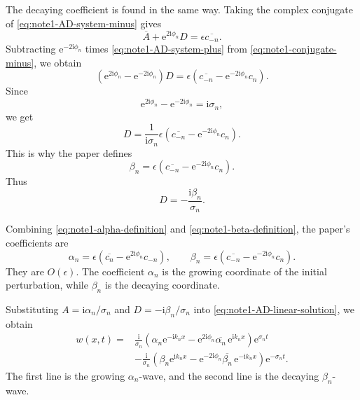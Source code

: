 \documentclass{amsart}
\newcounter{note}
\numberwithin{equation}{hw}
\begin{document}
The decaying coefficient is found in the same way.  Taking the complex
conjugate of \eqref{eq:note1-AD-system-minus} gives
\begin{equation}
\overline{A}+\mathrm{e}^{2\mathrm{i}\phi_n}D
=
\epsilon\overline{c_{-n}}.
\label{eq:note1-conjugate-minus}
\end{equation}
Subtracting \(\mathrm{e}^{-2\mathrm{i}\phi_n}\) times
\eqref{eq:note1-AD-system-plus} from \eqref{eq:note1-conjugate-minus}, we
obtain
\begin{equation}
\left(
\mathrm{e}^{2\mathrm{i}\phi_n}
-
\mathrm{e}^{-2\mathrm{i}\phi_n}
\right)D
=
\epsilon
\left(
\overline{c_{-n}}
-
\mathrm{e}^{-2\mathrm{i}\phi_n}c_n
\right).
\label{eq:note1-solve-D-pre}
\end{equation}
Since
\[
\mathrm{e}^{2\mathrm{i}\phi_n}
-
\mathrm{e}^{-2\mathrm{i}\phi_n}
=
\mathrm{i}\sigma_n,
\]
we get
\begin{equation}
D
=
\frac{1}{\mathrm{i}\sigma_n}
\epsilon
\left(
\overline{c_{-n}}
-
\mathrm{e}^{-2\mathrm{i}\phi_n}c_n
\right).
\label{eq:note1-D-beta-pre}
\end{equation}
This is why the paper defines
\begin{equation}
\beta_n
=
\epsilon
\left(
\overline{c_{-n}}
-
\mathrm{e}^{-2\mathrm{i}\phi_n}c_n
\right).
\label{eq:note1-beta-definition}
\end{equation}
Thus
\begin{equation}
D=-\frac{\mathrm{i}\beta_n}{\sigma_n}.
\label{eq:note1-D-beta}
\end{equation}

Combining \eqref{eq:note1-alpha-definition} and
\eqref{eq:note1-beta-definition}, the paper's coefficients are
\begin{equation}
\alpha_n
=
\epsilon
\left(
\overline{c_n}
-
\mathrm{e}^{2\mathrm{i}\phi_n}c_{-n}
\right),
\qquad
\beta_n
=
\epsilon
\left(
\overline{c_{-n}}
-
\mathrm{e}^{-2\mathrm{i}\phi_n}c_n
\right).
\label{eq:note1-alpha-beta}
\end{equation}
They are \(O(\epsilon)\).  The coefficient \(\alpha_n\) is the growing
coordinate of the initial perturbation, while \(\beta_n\) is the decaying
coordinate.

Substituting \(A=\mathrm{i}\alpha_n/\sigma_n\) and
\(D=-\mathrm{i}\beta_n/\sigma_n\) into
\eqref{eq:note1-AD-linear-solution}, we obtain
\begin{align}
w(x,t)
={}&
\frac{\mathrm{i}}{\sigma_n}
\left(
\alpha_n\mathrm{e}^{-\mathrm{i}k_nx}
-
\mathrm{e}^{2\mathrm{i}\phi_n}
\overline{\alpha_n}\,
\mathrm{e}^{\mathrm{i}k_nx}
\right)
\mathrm{e}^{\sigma_nt}
\nonumber\\
&-
\frac{\mathrm{i}}{\sigma_n}
\left(
\beta_n\mathrm{e}^{\mathrm{i}k_nx}
-
\mathrm{e}^{-2\mathrm{i}\phi_n}
\overline{\beta_n}\,
\mathrm{e}^{-\mathrm{i}k_nx}
\right)
\mathrm{e}^{-\sigma_nt}.
\label{eq:note1-linear-complex-form}
\end{align}
The first line is the growing \(\alpha_n\)-wave, and the second line is
the decaying \(\beta_n\)-wave.
\end{document}
